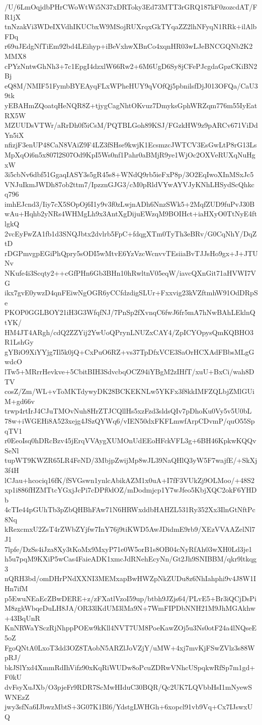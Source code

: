 /U/6LmOqjdbPHrCWoWtWi5N37xDRToky3Ed73MTT3rGRQ187kF0zozcdAT/FR1jX
tnNzakVi3WDeIXVdhIKUCbxW9MSojRUXrqxGkTYqaZZ2lhNFyqN1RRk+ilAlbFDq
r69uJEdgNfTiEm92bd4LEihyp+iBeVxhwXBnCo4xqnHR03wLJeBNCGQNb2K2MMX8
cPYzNntwGhNh3+7c1EpgI4dzxlW66Rw2+6M6UgD6Sy8jCFePJcgdaGpzCKiBN2Bj
eQ8M/NMIF51FymbBYEAyqFLxWPheHUY9qVOfQj5pbnilsfDjJ013OFQa/CaU39tk
yEBAHmZQoatqHeNQR8Z+tjygCagNhtOKvuz7DmyksGphWRZqm776m55IyEatRX5W
MZUUDsVTWr/aRrDh0f5iCsM/PQTBLGoh89KSJ/FGzkHW9z9pARCv671ViDdYn5iX
nfizjF3enUP48CaN8VAiZ9F4LZ3fSHse9kwjK1EcsmzcJWTCV3EsGwLtP8rG13Ls
MpXqOi6n5x807l2S07Od9KpI5Ws0nf1Pahr0aBMjR9ye1WjOc2OXVeRUXqNuHgxW
3i5cbNv6dbf51GgaqIASY3s5gR45s8+WNdQ9rb5ieFxP8p/3O2EqIwoXInMSxJc5
VNJuIkmJWDh87ob2ttm7/IpzznGJG3/cM0pRldVYwAYVJyKNhLHSydScQhkcq796
imhEJcnd3/Iiy7cX5SOpOj6I1y9v3f0zLwjnADh6NnzSWk5+2MqfZUD9fuPvJ30B
wAu+Hqhb2yNRs4WHMgLh9x3AntXgDijuEWzqM9BOIHct+iaHXyO0TtNyE4ftlgkQ
2vcEyFwZA1fb1d3SNQJbtx2dvlrb5FpC+fdqgXTm0TyTh3eBRv/G0CqNhY/DqZtD
rDGPmvgpEGiPhQpry5sODI5wMtvE6YzVzcWcnvvTEsiiaBvTJJsHo9gx+J+JTUNv
NKufe4i3Scqty2++cGfPHn6Gb3BHn10hRwltnV05eqW/iavcQXnGit71aHVWI7VG
ikx7gvE0ywzD4qnFEiwNgOGR6yCCfdzdigSLUr+Fxxvig23kVZftmhW91OdDRpSe
PKOP0GGLBOY21iH3G3WfqfNJ/7PnSp2fXvnqC6fwJ6fr5mA7hNwBAhLEklnQtYK/
HM4JT4ARgh/cdQ2ZZYij2YwUoQPrynLNUZxCAY4/ZpICYOpysQmKQBHO3R1LshGy
gYBiO9XiYYjg7Il5k0jQ+CxPuO6RZ+vs37TpDfxVCE3SaOrHCXAdFBbsMLgGwdcO
lTw5+MRrrHevkve+5CbitBIH3SdvcbqOCZ94iYBgM2zIHfT/xuU+BxCi/wah8DTV
cosZ/Zm/WL+vToMKTdywyDK28BCKEKNLw5YKFx3f8kkIMFZQLbjZMlGUiM+gd66v
trwp4rtIrJ4CJuTMOvNuh8HrZTJCQllHs5xzFzd3sldsQIv7pDhoKu0Vy5v5U0bL
78w+iWGEHi8A523xejg4JSzQYWq6/vIEN50dxFKFLmwfArpCDvmP/quO55SpqTV1
r0EeoIsq0hDRcBzv45jErqVVAygXUMOnUdEEoHFckVFL3g+6BH46KpkwKQQvSeNl
tupWT9KWZR65LR4FeND/3MbjpZwijMp8wJL39NaQHlQ3yW5F7wajfE/+SkXj3f4H
lCJau+hcociq16fK/fSVGswn1ynlcAbikAZM1x0uA+I7fF3VUkZj9OLMoo/+48S2
xp1i886fHZMTtcYGxjJcPi7cDPf0dOZ/mDodmjcp1Y7wJfeo5KbjXQC2okF6YHDb
4cTIe44pGUhTb3pZbQHBhFAw71N6HRWxddbHAHZL531Ry352Xx3IlnGtNftPc8Nq
kRexcmxU2ZsT4rZWbZYjfw7InY76j9tiKWD5AwJDidmE9rb9/XEzVVAAZelNl7J1
7lpfe/DzSs4iJza8Xy3tKoMx9MxyP71e0W5orB1s8OB04cNyRfAh03wXH0Ld3je1
h5u7pqM9KXiP5wCas4FaieADK1xmcJdRNehEcyNn/Gt2Jh9SNIBBM/qkr9ltkqg3
nQRH3bd/omDHrPNdXXNI3MEMxapBwHWZpNkZUDu8z6NhIahphi9v4J8W1IHn7ifM
p5EwuNEaEcZBwDERE+z/zFXatlVzoI59up/btbh9JZjs64/PLvE5+Br3iQCjDsPi
M8zgkWbqeDuLH8JA/OR33lKdUM3lMa9N+7WmFIPDbNNH21M9JhMGAkhw+43BqUnR
KnNRWaYSczRjNhppPOEw9kKll4NVT7UM8PoeKawZOj5u3Ns0otF24a4lNQseE5oZ
FgoQNtA0LxoT3dd3OZ8TAobN5ARZlJoVZjY/uMW+4xj7mvKjFSwZVlz3s88WpRJ/
bkJSlYxd4XmmRdIhVifz90xKqRiWUDw8oPcuZDRwVNhcUSpqkwRfSp7m1gd+F0kU
dvFsyXuJXb/O3pjeFr9RDR7ScMwHIduC30BQR/Qc2UK7LQVbbHsI1mNyewSWNEzZ
jwy3sfNa6IJbwzMbtS+3G07K1Bl6/YdstgLWHGh+6xopcl91vb9Vq+Cx7IJswxUQ
